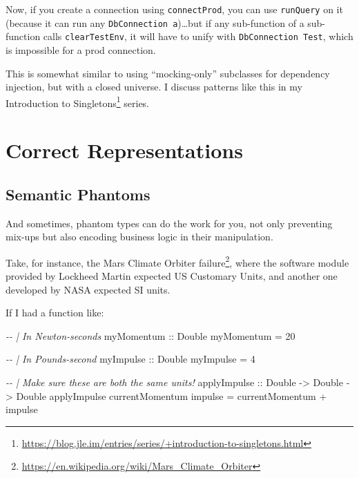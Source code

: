 \documentclass[]{article}
\newenvironment{Shaded}{}{}
\newcommand{\CommentTok}[1]{\textcolor[rgb]{0.38,0.63,0.69}{\textit{#1}}}
\newcommand{\DataTypeTok}[1]{\textcolor[rgb]{0.56,0.13,0.00}{#1}}
\newcommand{\DecValTok}[1]{\textcolor[rgb]{0.25,0.63,0.44}{#1}}
\newcommand{\NormalTok}[1]{#1}
\newcommand{\OperatorTok}[1]{\textcolor[rgb]{0.40,0.40,0.40}{#1}}
\newcommand{\OtherTok}[1]{\textcolor[rgb]{0.00,0.44,0.13}{#1}}
\renewcommand{\href}[2]{#2\footnote{\url{#1}}}
\begin{document}
Now, if you create a connection using \texttt{connectProd}, you can use
\texttt{runQuery} on it (because it can run any
\texttt{DbConnection\ a})\ldots but if any sub-function of a sub-function calls
\texttt{clearTestEnv}, it will have to unify with \texttt{DbConnection\ Test},
which is impossible for a prod connection.

This is somewhat similar to using ``mocking-only'' subclasses for dependency
injection, but with a closed universe. I discuss patterns like this in my
\href{https://blog.jle.im/entries/series/+introduction-to-singletons.html}{Introduction
to Singletons} series.

\section{Correct Representations}\label{correct-representations}

\subsection{Semantic Phantoms}\label{semantic-phantoms}

And sometimes, phantom types can do the work for you, not only preventing
mix-ups but also encoding business logic in their manipulation.

Take, for instance, the
\href{https://en.wikipedia.org/wiki/Mars_Climate_Orbiter}{Mars Climate Orbiter
failure}, where the software module provided by Lockheed Martin expected US
Customary Units, and another one developed by NASA expected SI units.

If I had a function like:

\begin{Shaded}
\begin{Highlighting}[]
\CommentTok{{-}{-} | In Newton{-}seconds}
\OtherTok{myMomentum ::} \DataTypeTok{Double}
\NormalTok{myMomentum }\OtherTok{=} \DecValTok{20}

\CommentTok{{-}{-} | In Pounds{-}second}
\OtherTok{myImpulse ::} \DataTypeTok{Double}
\NormalTok{myImpulse }\OtherTok{=} \DecValTok{4}

\CommentTok{{-}{-} | Make sure these are both the same units!}
\OtherTok{applyImpulse ::} \DataTypeTok{Double} \OtherTok{{-}\textgreater{}} \DataTypeTok{Double} \OtherTok{{-}\textgreater{}} \DataTypeTok{Double}
\NormalTok{applyImpulse currentMomentum impulse }\OtherTok{=}\NormalTok{ currentMomentum }\OperatorTok{+}\NormalTok{ impulse}
\end{Highlighting}
\end{Shaded}
\end{document}
